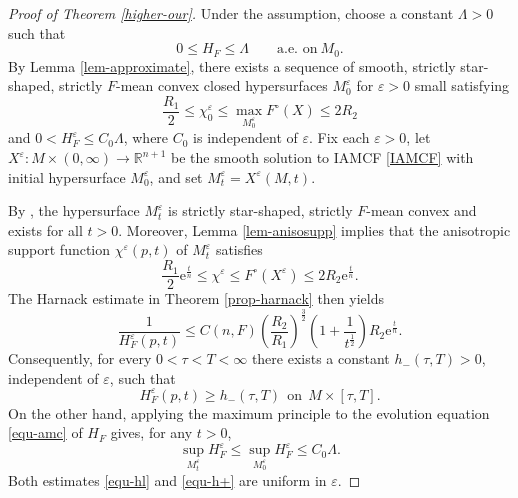 \documentclass[10pt,a4paper]{amsart}
\numberwithin{equation}{section}
\begin{document}
\begin{proof}[Proof of Theorem \ref{higher-our}]
Under the assumption,  choose a constant $\Lambda>0$ such that
		\begin{equation*}
			0\leq H_F \leq \Lambda \qquad \text{a.e.\ on}\ M_0.
		\end{equation*}
		By Lemma \ref{lem-approximate}, there exists a sequence of smooth, strictly star-shaped, strictly $F$-mean convex closed hypersurfaces $M_0^{\varepsilon}$ for $\varepsilon>0$ small satisfying
		\begin{equation*}
			\dfrac{R_1}{2} \leq \chi^{\varepsilon}_0 \leq \max\limits_{M_0^{\varepsilon}}F^{\circ}(X) \leq 2R_2
		\end{equation*}
		and $0< H_F^{\varepsilon} \leq C_0\Lambda$,  where $C_0$ is independent of $\varepsilon$. Fix each $\varepsilon>0$, let $X^{\varepsilon}:M\times(0,\infty)\to\mathbb R^{n+1}$
		be the smooth solution to IAMCF \eqref{IAMCF} with initial hypersurface $M_0^{\varepsilon}$, and set $M_t^{\varepsilon}=X^{\varepsilon}(M,t)$. 
        
         By \cite[Theorem 1.1]{Xia17}, the hypersurface $M_t^{\varepsilon}$ is strictly star-shaped, strictly $F$-mean convex and exists for all $t>0$. Moreover, Lemma \ref{lem-anisosupp} implies that the anisotropic support function $\chi^{\varepsilon}(p,t)$ of $M_t^{\varepsilon}$ satisfies
		\begin{equation}
			\label{equ-suppest}
			\dfrac{R_1}{2}\mathrm{e}^{\frac{t}{n}} \leq \chi^{\varepsilon}\leq F^{\circ}(X^{\varepsilon})\leq 2R_2 \mathrm{e}^{\frac{t}{n}}.
		\end{equation}
		The Harnack estimate in Theorem \ref{prop-harnack} then yields
		\begin{equation}
			\label{equ-harnackseq}
			\dfrac{1}{H_F^{\varepsilon}(p,t)} \leq C(n,F)\left(\dfrac{R_2}{R_1}\right)^{\frac{3}{2}}\left(1+\frac{1}{t^{\frac{1}{2}}} \right)R_2\mathrm{e}^{\frac{t}{n}}.
		\end{equation}
		Consequently, for every $0<\tau<T<\infty$ there exists a constant $h_{-}(\tau,T)>0$, independent of $\varepsilon$, such that
		\begin{equation}
			\label{equ-hl}
			H_F^{\varepsilon}(p,t)\geq h_-(\tau,T)\ \ \text{on}\ \ M\times [\tau,T].
		\end{equation}
		On the other hand, applying the maximum principle to the evolution equation \eqref{equ-amc} of $H_F$ gives, for any $t>0$,
		\begin{equation}
			\sup_{M_t^\varepsilon}H_F^\varepsilon \leq \sup_{M_0^\varepsilon} H_F^{\varepsilon}  \leq C_0\Lambda.
			\label{equ-h+}
		\end{equation}
		Both estimates \eqref{equ-hl} and \eqref{equ-h+} are uniform  in $\varepsilon$.
		

\end{proof}
\end{document}
